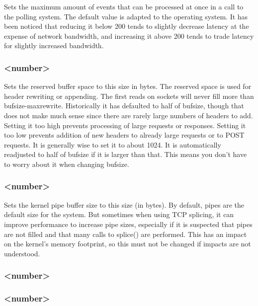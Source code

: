 Sets the maximum amount of events that can be processed at once in a call to
the polling system. The default value is adapted to the operating system. It
has been noticed that reducing it below 200 tends to slightly decrease
latency at the expense of network bandwidth, and increasing it above 200
tends to trade latency for slightly increased bandwidth.

\subsubsection[tune.maxrewrite]{ <number>}

Sets the reserved buffer space to this size in bytes. The reserved space is
used for header rewriting or appending. The first reads on sockets will never
fill more than bufsize-maxrewrite. Historically it has defaulted to half of
bufsize, though that does not make much sense since there are rarely large
numbers of headers to add. Setting it too high prevents processing of large
requests or responses. Setting it too low prevents addition of new headers
to already large requests or to POST requests. It is generally wise to set it
to about 1024. It is automatically readjusted to half of bufsize if it is
larger than that. This means you don't have to worry about it when changing
bufsize.

\subsubsection[tune.pipesize]{ <number>}

Sets the kernel pipe buffer size to this size (in bytes). By default, pipes
are the default size for the system. But sometimes when using TCP splicing,
it can improve performance to increase pipe sizes, especially if it is
suspected that pipes are not filled and that many calls to splice() are
performed. This has an impact on the kernel's memory footprint, so this must
not be changed if impacts are not understood.

\subsubsection[tune.rcvbuf.client]{ <number>}
\subsubsection[tune.rcvbuf.server]{ <number>}

